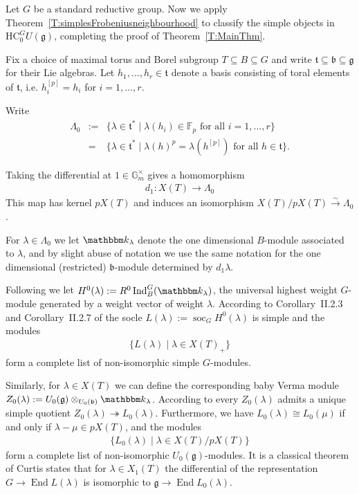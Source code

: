 \documentclass[twoside,12pt,reqno]{amsart}
\theoremstyle{remark}
\numberwithin{equation}{section}
\def\onto{\twoheadrightarrow}
\def\isoto{\overset{\sim}{\longrightarrow}}
\def\k{{\mathbbm k}}
\def\G{\mathbb{G}}
\def\Ind{\operatorname{Ind}}
\def\End{\operatorname{End}}
\def\F{{\mathbb F}}
\def\G{{\mathbb G}}
\def\HC{\mathrm{HC}}
\def\soc{\operatorname{soc}}
\def\b{\mathfrak b}
\def\g{{\mathfrak g}}
\def\t{\mathfrak t}
\def\b{\mathfrak{b}}
\begin{document}
Let $G$ be a standard reductive group. Now we apply Theorem~\ref{T:simplesFrobeniusneighbourhood} to classify the simple objects in $\HC_0^G U(\g)$, completing the proof of Theorem~\ref{T:MainThm}.

Fix a choice of maximal torus and Borel subgroup $T \subseteq B \subseteq G$ and write $\t \subseteq \b \subseteq \g$ for their Lie algebras. Let $h_1,...,h_r \in \t$ denote a basis consisting of toral elements of $\t$, i.e. $h_i^{[p]} = h_i$ for $i=1,...,r$.

Write
\begin{eqnarray*}
\Lambda_0 &:=& \{ \lambda \in \t^* \mid \lambda(h_i) \in \F_p \text{ for all } i = 1,...,r\} \\
& = & \{\lambda\in \t^* \mid \lambda(h)^p = \lambda(h^{[p]}) \text{ for all } h\in \t\}.
\end{eqnarray*}

Taking the differential at $1\in \G_m^\times$ gives a homomorphism
\begin{eqnarray}
    d_1 : X(T) \to \Lambda_0
\end{eqnarray}
This map has kernel $p X(T)$ and induces an isomorphism $X(T) / pX(T) \isoto \Lambda_0$.

For $\lambda \in \Lambda_0$ we let $\k_\lambda$ denote the one dimensional $B$-module associated to $\lambda$, and by slight abuse of notation we use the same notation for the one dimensional (restricted) $\b$-module determined by $d_1\lambda$.

Following \cite[II.2.1]{JanRAGS} we let $H^0(\lambda) := R^0 \Ind_B^G(\k_\lambda)$, the universal highest weight $G$-module generated by a weight vector of weight $\lambda$. According to Corollary~II.2.3 and Corollary~II.2.7 of \cite{JanRAGS} the socle $L(\lambda) := \soc_G H^0(\lambda)$ is simple and the modules
\begin{eqnarray}
    \{L(\lambda) \mid \lambda \in X(T)_+\}
\end{eqnarray}
form a complete list of non-isomorphic simple $G$-modules.

Similarly, for $\lambda \in X(T)$ we can define the corresponding baby Verma module $Z_0(\lambda) := U_0(\g) \otimes_{U_0(\b)} \k_\lambda$. According to \cite[]{JaLA} every $Z_0(\lambda)$ admits a unique simple quotient $Z_0(\lambda) \onto L_0(\lambda)$. Furthermore, we have $L_0(\lambda) \cong L_0(\mu)$ if and only if $\lambda -\mu \in p X(T)$, and the modules
\begin{eqnarray}
\{L_0(\lambda) \mid \lambda \in X(T) / pX(T)\}
\end{eqnarray}
form a complete list of non-isomorphic $U_0(\g)$-modules. It is a classical theorem of Curtis \cite{Cu} states that for $\lambda \in X_1(T)$ the differential of the representation $G \to \End L(\lambda)$ is isomorphic to $\g \to \End L_0(\lambda)$.
\end{document}
